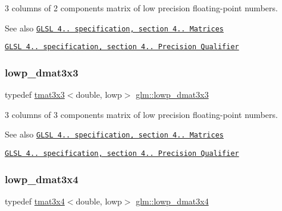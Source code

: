 3 columns of 2 components matrix of low precision floating-\/point numbers.

\begin{DoxySeeAlso}{See also}
\href{http://www.opengl.org/registry/doc/GLSLangSpec.4.20.8.pdf}{\tt G\+L\+SL 4.. specification, section 4.. Matrices} 

\href{http://www.opengl.org/registry/doc/GLSLangSpec.4.20.8.pdf}{\tt G\+L\+SL 4.. specification, section 4.. Precision Qualifier} 
\end{DoxySeeAlso}
\mbox{\label{group__core__precision_ga8cc302ca16a2ae1708143c85d50de0e7}} 
\subsubsection{\texorpdfstring{lowp\+\_\+dmat3x3}{lowp\_dmat3x3}}
{\footnotesize\ttfamily typedef \hyperlink{structglm_1_1tmat3x3}{tmat3x3}$<$double, lowp$>$ \hyperlink{group__core__precision_ga8cc302ca16a2ae1708143c85d50de0e7}{glm\+::lowp\+\_\+dmat3x3}}

3 columns of 3 components matrix of low precision floating-\/point numbers.

\begin{DoxySeeAlso}{See also}
\href{http://www.opengl.org/registry/doc/GLSLangSpec.4.20.8.pdf}{\tt G\+L\+SL 4.. specification, section 4.. Matrices} 

\href{http://www.opengl.org/registry/doc/GLSLangSpec.4.20.8.pdf}{\tt G\+L\+SL 4.. specification, section 4.. Precision Qualifier} 
\end{DoxySeeAlso}
\mbox{\label{group__core__precision_gadbca772b626928af301ea079903ee5d9}} 
\subsubsection{\texorpdfstring{lowp\+\_\+dmat3x4}{lowp\_dmat3x4}}
{\footnotesize\ttfamily typedef \hyperlink{structglm_1_1tmat3x4}{tmat3x4}$<$double, lowp$>$ \hyperlink{group__core__precision_gadbca772b626928af301ea079903ee5d9}{glm\+::lowp\+\_\+dmat3x4}}

